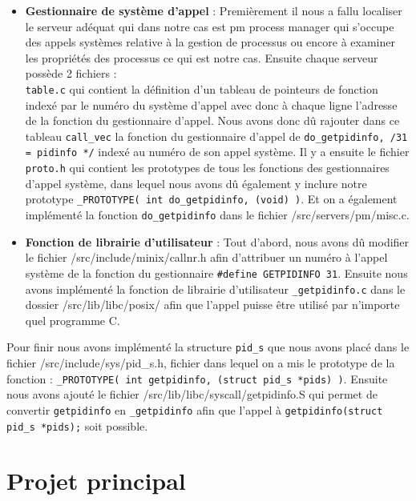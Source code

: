 \documentclass[10pt, onecolumn] {IEEEtran}
\begin{document}
\begin{itemize}
\item \textbf{Gestionnaire de système d'appel} : Premièrement il nous a fallu localiser le serveur adéquat qui dans notre cas est pm \og process manager \fg qui s'occupe des appels systèmes relative à la gestion de processus ou encore à examiner les propriétés des processus ce qui est notre cas. Ensuite chaque serveur possède 2 fichiers : \\ \texttt{table.c} qui contient la définition d'un tableau de pointeurs de fonction indexé par le numéro du système d'appel avec donc à chaque ligne l'adresse de la fonction du gestionnaire d'appel. Nous avons donc dû rajouter dans ce tableau \texttt{call\_vec} la fonction du gestionnaire d'appel de \texttt{do\_getpidinfo,	\slash* 31 = pidinfo	*\slash} indexé au numéro de son appel système. Il y a ensuite le fichier  \texttt{proto.h} qui contient les prototypes de tous les fonctions des gestionnaires d'appel système, dans lequel nous avons dû également y inclure notre prototype \texttt{\_PROTOTYPE( int do\_getpidinfo, (void)					)}. Et on a également implémenté la fonction  \texttt{do\_getpidinfo} dans le fichier /src/servers/pm/misc.c.\\

\item \textbf{Fonction de librairie d'utilisateur} : Tout d'abord, nous avons dû modifier le fichier /src/include/minix/callnr.h afin d'attribuer un numéro à l'appel système de la fonction du gestionnaire \texttt{\#define GETPIDINFO 31}. Ensuite nous avons implémenté la fonction de librairie d'utilisateur \texttt{\_getpidinfo.c} dans le dossier /src/lib/libc/posix/ afin que l'appel puisse être utilisé par n'importe quel programme C.  \\
\end{itemize}

Pour finir nous avons implémenté la structure \texttt{pid\_s} que nous avons placé dans le fichier /src/include/sys/pid\_s.h, fichier dans lequel on a mis le prototype de la fonction : \texttt{\_PROTOTYPE( int getpidinfo, (struct pid\_s *pids)            )}. Ensuite nous avons ajouté le fichier /src/lib/libc/syscall/getpidinfo.S qui permet de convertir \texttt{getpidinfo} en  \texttt{\_getpidinfo} afin que l'appel à \texttt{getpidinfo(struct pid\_s *pids);} soit possible. 

\newpage
\section{Projet principal}
\end{document}
